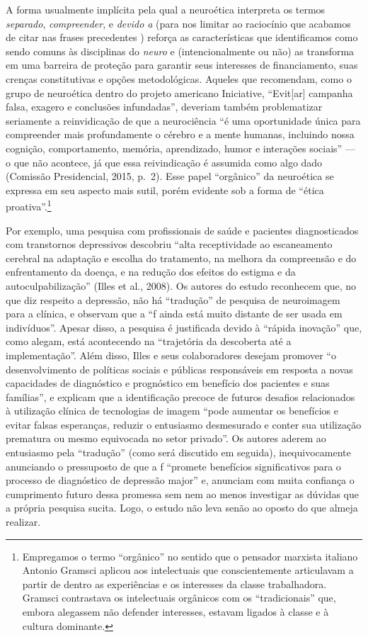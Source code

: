 A forma usualmente implícita pela qual a neuroética interpreta os termos
\emph{separado}, \emph{compreender}, e \emph{devido a} (para nos limitar
ao raciocínio que acabamos de citar nas frases precedentes ) reforça as
características que identificamos como sendo comuns às disciplinas do
\emph{neuro} e (intencionalmente ou não) as transforma em uma barreira
de proteção para garantir seus interesses de financiamento, suas crenças
constitutivas e opções metodológicas. Aqueles que recomendam, como o
grupo de neuroética dentro do projeto americano  Iniciative,
``Evit{[}ar{]} campanha falsa, exagero e conclusões infundadas'',
deveriam também problematizar seriamente a reinvidicação de que a
neurociência ``é uma oportunidade única para compreender mais
profundamente o cérebro e a mente humanas, incluindo nossa cognição,
comportamento, memória, aprendizado, humor e interações sociais'' --- o
que não acontece, já que essa reivindicação é assumida como algo dado
(Comissão Presidencial, 2015, p.~2). Esse papel ``orgânico'' da
neuroética se expressa em seu aspecto mais sutil, porém evidente sob a
forma de ``ética proativa''.\footnote[4]{Empregamos o termo ``orgânico'' no sentido que o pensador marxista
italiano Antonio Gramsci aplicou aos intelectuais que conscientemente
articulavam a partir de dentro as experiências e os interesses da classe
trabalhadora. Gramsci contrastava os intelectuais orgânicos com os
``tradicionais'' que, embora alegassem não defender interesses, estavam
ligados à classe e à cultura dominante.}

Por exemplo, uma pesquisa com profissionais de saúde e pacientes
diagnosticados com transtornos depressivos descobriu ``alta
receptividade ao escaneamento cerebral na adaptação e escolha do
tratamento, na melhora da compreensão e do enfrentamento da doença, e na
redução dos efeitos do estigma e da autoculpabilização'' (Illes et al.,
2008). Os autores do estudo reconhecem que, no que diz respeito a
depressão, não há ``tradução'' de pesquisa de neuroimagem para a
clínica, e observam que a ``f ainda está muito distante de ser usada
em indivíduos''. Apesar disso, a pesquisa é justificada devido à
``rápida inovação'' que, como alegam, está acontecendo na ``trajetória
da descoberta até a implementação''. Além disso, Illes e seus
colaboradores desejam promover ``o desenvolvimento de políticas sociais
e públicas responsáveis em resposta a novas capacidades de diagnóstico e
prognóstico em benefício dos pacientes e suas famílias'', e explicam que
a identificação precoce de futuros desafios relacionados à utilização
clínica de tecnologias de imagem ``pode aumentar os benefícios e evitar
falsas esperanças, reduzir o entusiasmo desmesurado e conter sua
utilização prematura ou mesmo equivocada no setor privado''. Os autores
aderem ao entusiasmo pela ``tradução'' (como será discutido em seguida),
inequivocamente anunciando o pressuposto de que a f ``promete
benefícios significativos para o processo de diagnóstico de depressão
major'' e, anunciam com muita confiança o cumprimento futuro dessa
promessa sem nem ao menos investigar as dúvidas que a própria pesquisa
sucita. Logo, o estudo não leva senão ao oposto do que almeja realizar.


